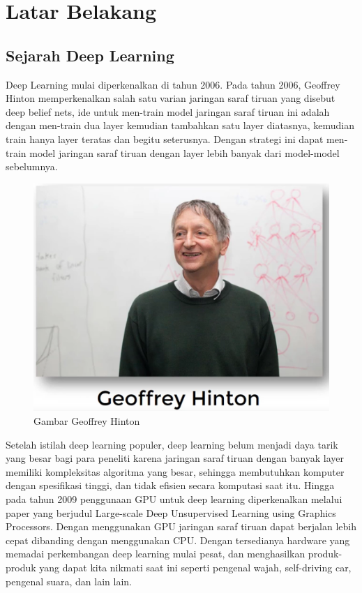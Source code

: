 \section{Latar Belakang}
\subsection{Sejarah Deep Learning}
Deep Learning mulai diperkenalkan di tahun 2006. Pada tahun 2006, Geoffrey Hinton memperkenalkan salah satu varian jaringan saraf tiruan yang disebut deep belief nets, ide untuk men-train model jaringan saraf tiruan ini adalah dengan men-train dua layer kemudian tambahkan satu layer diatasnya, kemudian train hanya layer teratas dan begitu seterusnya. Dengan strategi ini dapat men-train model jaringan saraf tiruan dengan layer lebih banyak dari model-model sebelumnya.

\begin{figure}[h!]
	\centering
	\includegraphics[scale=0.3]{figures/7.PNG}
	\caption{Gambar Geoffrey Hinton}
	\label{labelgambar1}
	\end{figure}

Setelah istilah deep learning populer, deep learning belum menjadi daya tarik yang besar bagi para peneliti karena jaringan saraf tiruan dengan banyak layer memiliki kompleksitas algoritma yang besar, sehingga membutuhkan komputer dengan spesifikasi tinggi, dan tidak efisien secara komputasi saat itu. Hingga pada tahun 2009 penggunaan GPU untuk deep learning diperkenalkan melalui paper yang berjudul Large-scale Deep Unsupervised Learning using Graphics Processors. Dengan menggunakan GPU jaringan saraf tiruan dapat berjalan lebih cepat dibanding dengan menggunakan CPU. Dengan tersedianya hardware yang memadai perkembangan deep learning mulai pesat, dan menghasilkan produk-produk yang dapat kita nikmati saat ini seperti pengenal wajah, self-driving car, pengenal suara, dan lain lain.



